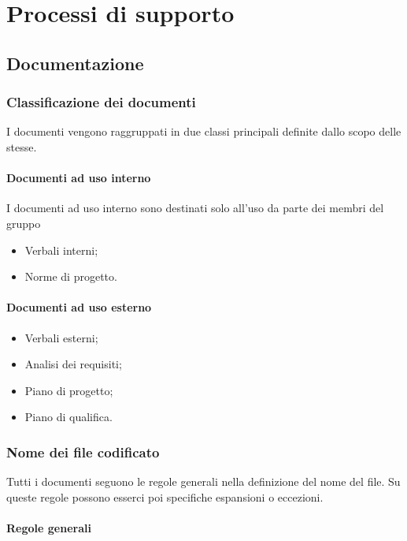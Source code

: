 \chapter{Processi di supporto}
\minitoc
\section{Documentazione}

\subsection{Classificazione dei documenti}

I documenti vengono raggruppati in due classi principali definite dallo scopo delle stesse.

\subsubsection{Documenti ad uso interno}

I documenti ad uso interno sono destinati solo all'uso da parte dei membri del gruppo 

\begin{itemize}
    \item Verbali interni;
    \item Norme di progetto.
\end{itemize}

\subsubsection{Documenti ad uso esterno}

\begin{itemize}
    \item Verbali esterni;
    \item Analisi dei requisiti;
    \item Piano di progetto;
    \item Piano di qualifica.
\end{itemize}

\subsection{Nome dei file codificato}

Tutti i documenti seguono le regole generali nella definizione del nome del file. Su queste regole possono esserci poi specifiche espansioni o eccezioni.

\subsubsection{Regole generali}
